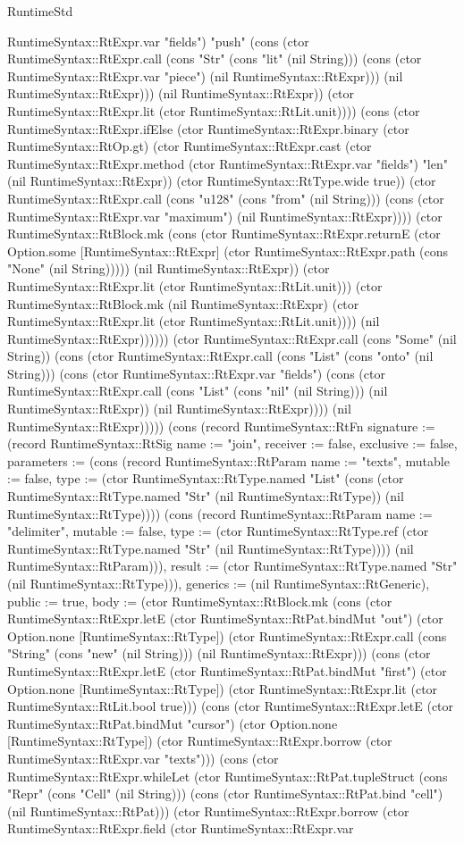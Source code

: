 \begin{lexlean}{RuntimeStd}
\begin{semanticmodule}
{RuntimeSyntax::RtExpr.var "fields") "push" (cons (ctor RuntimeSyntax::RtExpr.call (cons "Str" (cons "lit" (nil String))) (cons (ctor RuntimeSyntax::RtExpr.var "piece") (nil RuntimeSyntax::RtExpr))) (nil RuntimeSyntax::RtExpr))) (nil RuntimeSyntax::RtExpr)) (ctor RuntimeSyntax::RtExpr.lit (ctor RuntimeSyntax::RtLit.unit)))) (cons (ctor RuntimeSyntax::RtExpr.ifElse (ctor RuntimeSyntax::RtExpr.binary (ctor RuntimeSyntax::RtOp.gt) (ctor RuntimeSyntax::RtExpr.cast (ctor RuntimeSyntax::RtExpr.method (ctor RuntimeSyntax::RtExpr.var "fields") "len" (nil RuntimeSyntax::RtExpr)) (ctor RuntimeSyntax::RtType.wide true)) (ctor RuntimeSyntax::RtExpr.call (cons "u128" (cons "from" (nil String))) (cons (ctor RuntimeSyntax::RtExpr.var "maximum") (nil RuntimeSyntax::RtExpr)))) (ctor RuntimeSyntax::RtBlock.mk (cons (ctor RuntimeSyntax::RtExpr.returnE (ctor Option.some [RuntimeSyntax::RtExpr] (ctor RuntimeSyntax::RtExpr.path (cons "None" (nil String))))) (nil RuntimeSyntax::RtExpr)) (ctor RuntimeSyntax::RtExpr.lit (ctor RuntimeSyntax::RtLit.unit))) (ctor RuntimeSyntax::RtBlock.mk (nil RuntimeSyntax::RtExpr) (ctor RuntimeSyntax::RtExpr.lit (ctor RuntimeSyntax::RtLit.unit)))) (nil RuntimeSyntax::RtExpr)))))) (ctor RuntimeSyntax::RtExpr.call (cons "Some" (nil String)) (cons (ctor RuntimeSyntax::RtExpr.call (cons "List" (cons "onto" (nil String))) (cons (ctor RuntimeSyntax::RtExpr.var "fields") (cons (ctor RuntimeSyntax::RtExpr.call (cons "List" (cons "nil" (nil String))) (nil RuntimeSyntax::RtExpr)) (nil RuntimeSyntax::RtExpr)))) (nil RuntimeSyntax::RtExpr))))}) (cons (record RuntimeSyntax::RtFn {signature := (record RuntimeSyntax::RtSig {name := "join", receiver := false, exclusive := false, parameters := (cons (record RuntimeSyntax::RtParam {name := "texts", mutable := false, type := (ctor RuntimeSyntax::RtType.named "List" (cons (ctor RuntimeSyntax::RtType.named "Str" (nil RuntimeSyntax::RtType)) (nil RuntimeSyntax::RtType)))}) (cons (record RuntimeSyntax::RtParam {name := "delimiter", mutable := false, type := (ctor RuntimeSyntax::RtType.ref (ctor RuntimeSyntax::RtType.named "Str" (nil RuntimeSyntax::RtType)))}) (nil RuntimeSyntax::RtParam))), result := (ctor RuntimeSyntax::RtType.named "Str" (nil RuntimeSyntax::RtType))}), generics := (nil RuntimeSyntax::RtGeneric), public := true, body := (ctor RuntimeSyntax::RtBlock.mk (cons (ctor RuntimeSyntax::RtExpr.letE (ctor RuntimeSyntax::RtPat.bindMut "out") (ctor Option.none [RuntimeSyntax::RtType]) (ctor RuntimeSyntax::RtExpr.call (cons "String" (cons "new" (nil String))) (nil RuntimeSyntax::RtExpr))) (cons (ctor RuntimeSyntax::RtExpr.letE (ctor RuntimeSyntax::RtPat.bindMut "first") (ctor Option.none [RuntimeSyntax::RtType]) (ctor RuntimeSyntax::RtExpr.lit (ctor RuntimeSyntax::RtLit.bool true))) (cons (ctor RuntimeSyntax::RtExpr.letE (ctor RuntimeSyntax::RtPat.bindMut "cursor") (ctor Option.none [RuntimeSyntax::RtType]) (ctor RuntimeSyntax::RtExpr.borrow (ctor RuntimeSyntax::RtExpr.var "texts"))) (cons (ctor RuntimeSyntax::RtExpr.whileLet (ctor RuntimeSyntax::RtPat.tupleStruct (cons "Repr" (cons "Cell" (nil String))) (cons (ctor RuntimeSyntax::RtPat.bind "cell") (nil RuntimeSyntax::RtPat))) (ctor RuntimeSyntax::RtExpr.borrow (ctor RuntimeSyntax::RtExpr.field (ctor RuntimeSyntax::RtExpr.var }
\end{semanticmodule}
\end{lexlean}
